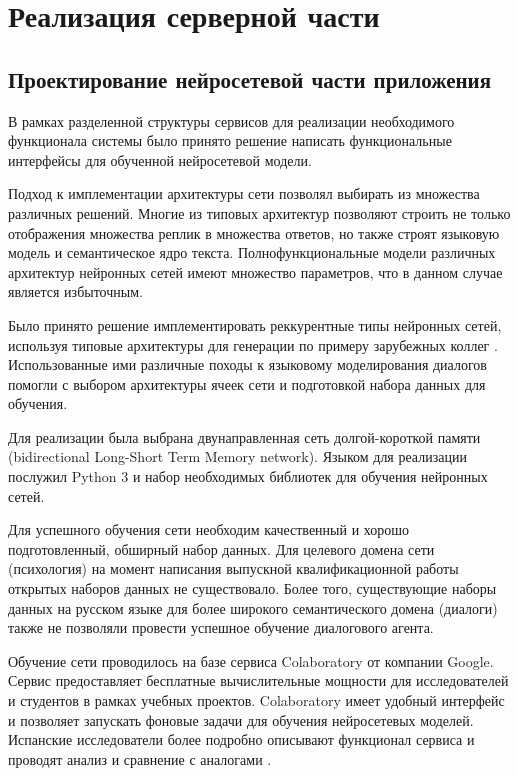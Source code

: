 \chapter{Реализация серверной части}
\section{Проектирование нейросетевой части приложения}
В рамках разделенной структуры сервисов для реализации необходимого функционала системы было принято решение написать функциональные интерфейсы для обученной нейросетевой модели. 

Подход к имплементации архитектуры сети позволял выбирать из множества различных решений. Многие из типовых архитектур позволяют строить не только отображения множества реплик в множества ответов, но также строят языковую модель и семантическое ядро текста. Полнофункциональные модели различных архитектур нейронных сетей имеют множество параметров, что в данном случае является избыточным. 

Было принято решение имплементировать реккурентные типы нейронных сетей, используя типовые архитектуры для генерации по примеру зарубежных коллег \cite{li2016deep, sharma2016natural,толкачев2019нейронное}. Использованные ими различные походы к языковому моделирования диалогов помогли с выбором архитектуры ячеек сети и подготовкой набора данных для обучения. 

Для реализации была выбрана двунаправленная сеть долгой-короткой памяти (bidirectional Long-Short Term Memory network). Языком для реализации послужил Python 3 и набор необходимых библиотек для обучения нейронных сетей.

Для успешного обучения сети необходим качественный и хорошо подготовленный, обширный набор данных. Для целевого домена сети (психология) на момент написания выпускной квалификационной работы открытых наборов данных не существовало. Более того, существующие наборы данных на русском языке для более широкого семантического домена (диалоги) также не позволяли провести успешное обучение диалогового агента. 

Обучение сети проводилось на базе сервиса Colaboratory от компании Google. Сервис предоставляет бесплатные вычислительные мощности для исследователей и студентов в рамках учебных проектов. Colaboratory имеет удобный интерфейс и позволяет запускать фоновые задачи для обучения нейросетевых моделей. Испанские исследователи более подробно описывают функционал сервиса и проводят анализ и сравнение с аналогами \cite{carneiro2018performance}.

